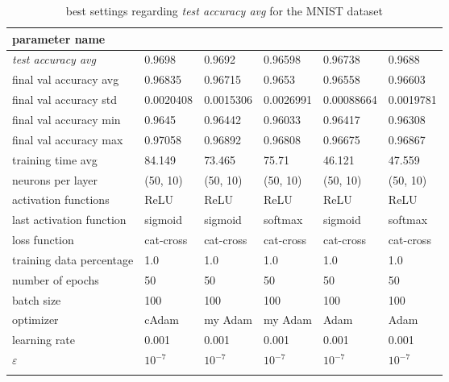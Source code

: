 \begin{longtable}{|l|>{\columncolor{bestColumnColor}}l|l|l|l|l|}
\hline
\textbf{parameter name} & \multicolumn{5}{c|}{\textbf{best values}} \\
\hline
\textit{test accuracy avg} &  0.9698 &  0.9692 & 0.96598 & 0.96738 &  0.9688 \\
final val accuracy avg   & 0.96835 & 0.96715 & 0.9653  & 0.96558 & 0.96603 \\
final val accuracy std   & 0.0020408 & 0.0015306 & 0.0026991 & 0.00088664 & 0.0019781 \\
final val accuracy min   & 0.9645  & 0.96442 & 0.96033 & 0.96417 & 0.96308 \\
final val accuracy max   & 0.97058 & 0.96892 & 0.96808 & 0.96675 & 0.96867 \\
training time avg        & 84.149  & 73.465  & 75.71   & 46.121  & 47.559  \\
{\color{equalParamColor} neurons per layer } & {\color{equalParamColor} (50, 10) } & {\color{equalParamColor} (50, 10) } & {\color{equalParamColor} (50, 10) } & {\color{equalParamColor} (50, 10) } & {\color{equalParamColor} (50, 10) } \\
{\color{equalParamColor} activation functions } & {\color{equalParamColor} ReLU } & {\color{equalParamColor} ReLU } & {\color{equalParamColor} ReLU } & {\color{equalParamColor} ReLU } & {\color{equalParamColor} ReLU } \\
last activation function & sigmoid & sigmoid & softmax & sigmoid & softmax \\
{\color{equalParamColor} loss function } & {\color{equalParamColor} cat-cross } & {\color{equalParamColor} cat-cross } & {\color{equalParamColor} cat-cross } & {\color{equalParamColor} cat-cross } & {\color{equalParamColor} cat-cross } \\
{\color{equalParamColor} training data percentage } & {\color{equalParamColor} 1.0 } & {\color{equalParamColor} 1.0 } & {\color{equalParamColor} 1.0 } & {\color{equalParamColor} 1.0 } & {\color{equalParamColor} 1.0 } \\
{\color{equalParamColor} number of epochs } & {\color{equalParamColor} 50 } & {\color{equalParamColor} 50 } & {\color{equalParamColor} 50 } & {\color{equalParamColor} 50 } & {\color{equalParamColor} 50 } \\
{\color{equalParamColor} batch size } & {\color{equalParamColor} 100 } & {\color{equalParamColor} 100 } & {\color{equalParamColor} 100 } & {\color{equalParamColor} 100 } & {\color{equalParamColor} 100 } \\
optimizer                & cAdam   & my Adam & my Adam & Adam    & Adam    \\
{\color{equalParamColor} learning rate } & {\color{equalParamColor} 0.001 } & {\color{equalParamColor} 0.001 } & {\color{equalParamColor} 0.001 } & {\color{equalParamColor} 0.001 } & {\color{equalParamColor} 0.001 } \\
{\color{equalParamColor} $\varepsilon$ } & {\color{equalParamColor} $10^{-7}$ } & {\color{equalParamColor} $10^{-7}$ } & {\color{equalParamColor} $10^{-7}$ } & {\color{equalParamColor} $10^{-7}$ } & {\color{equalParamColor} $10^{-7}$ } \\
\hline

\caption{best settings regarding \textit{test accuracy avg} for the MNIST dataset}
\label{table:variant_test_accuracy_avg_best_mnist}
\end{longtable}
